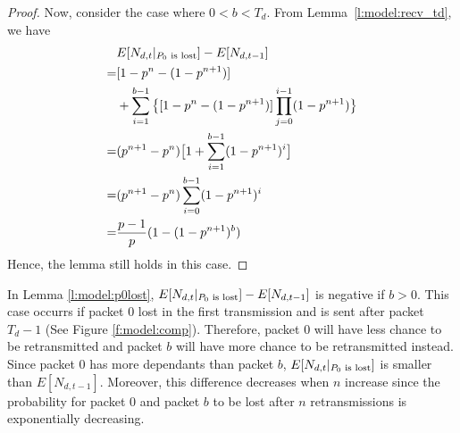 \begin{proof}
    Now, consider the case where $0 < b < T_d$.
    From Lemma~\ref{l:model:recv_td},
    we have
    \begin{align*}
     &E[N_{d,t}|_{\textrm{$P_0$ is lost}}] - E[N_{d,t-1}] \\
    =&[1-p^n - (1-p^{n+1})]\\
     &+ \sum_{i=1}^{b-1}\big\{[1-p^n - (1-p^{n+1})]\prod_{j=0}^{i-1}(1-p^{n+1})\big\} \\
    =&(p^{n+1} - p^n)\big[1 + \sum_{i=1}^{b-1}(1-p^{n+1})^i\big]\\
    =&(p^{n+1} - p^n)\sum_{i=0}^{b-1}(1-p^{n+1})^i\\
    =&\dfrac{p-1}{p}(1- (1-p^{n+1})^b) \\
    \end{align*}
    Hence, the lemma still holds in this case.
    \QED
    \end{proof}

    In Lemma \ref{l:model:p0lost}, $E[N_{d,t}|_{\textrm{$P_0$ is lost}}] - E[N_{d,t-1}]$ is negative if $b > 0$. 
    This case occurrs if packet $0$ lost in the first transmission and is sent after 
    packet $T_d - 1$ (See Figure \ref{f:model:comp}).
    Therefore, packet $0$ will 
    have less chance to be retransmitted and packet $b$ will have more chance to be retransmitted instead.
    Since packet $0$ has more dependants than packet $b$, $E[N_{d,t}|_{\textrm{$P_0$ is lost}}]$ is smaller than 
    $E[N_{d,t-1}]$. Moreover, this difference decreases when $n$ increase since the probability for 
    packet $0$ and packet $b$ to be lost after $n$ retransmissions is exponentially decreasing.
    
